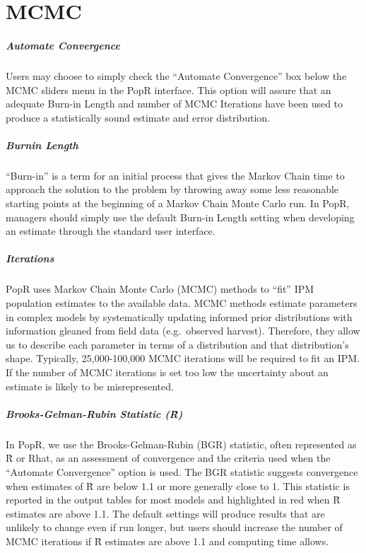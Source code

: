 \documentclass[
]{book}
\begin{document}
\hypertarget{gl-mcmc}{%
\section{MCMC}\label{gl-mcmc}}

\hypertarget{gl-converge}{%
\subparagraph*{Automate Convergence}\label{gl-converge}}

Users may choose to simply check the ``Automate Convergence'' box below the MCMC sliders menu in the PopR interface. This option will assure that an adequate Burn-in Length and number of MCMC Iterations have been used to produce a statistically sound estimate and error distribution.

\hypertarget{gl-burn-in}{%
\subparagraph*{Burnin Length}\label{gl-burn-in}}

``Burn-in'' is a term for an initial process that gives the Markov Chain time to approach the solution to the problem by throwing away some less reasonable starting points at the beginning of a Markov Chain Monte Carlo run. In PopR, managers should simply use the default Burn-in Length setting when developing an estimate through the standard user interface.

\hypertarget{gl-iter}{%
\subparagraph*{Iterations}\label{gl-iter}}

PopR uses Markov Chain Monte Carlo (MCMC) methods to ``fit'' IPM population estimates to the available data. MCMC methods estimate parameters in complex models by systematically updating informed prior distributions with information gleaned from field data (e.g.~observed harvest). Therefore, they allow us to describe each parameter in terms of a distribution and that distribution's shape. Typically, 25,000-100,000 MCMC iterations will be required to fit an IPM. If the number of MCMC iterations is set too low the uncertainty about an estimate is likely to be misrepresented.

\hypertarget{gl-rhat}{%
\subparagraph*{Brooks-Gelman-Rubin Statistic (R̂)}\label{gl-rhat}}

In PopR, we use the Brooks-Gelman-Rubin (BGR) statistic, often represented as R̂ or Rhat, as an assessment of convergence and the criteria used when the ``Automate Convergence'' option is used. The BGR statistic suggests convergence when estimates of R̂ are below 1.1 or more generally close to 1. This statistic is reported in the output tables for most models and highlighted in red when R̂ estimates are above 1.1. The default settings will produce results that are unlikely to change even if run longer, but users should increase the number of MCMC iterations if R̂ estimates are above 1.1 and computing time allows.
\end{document}
